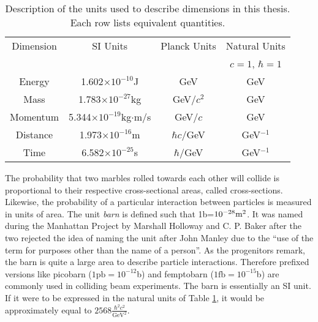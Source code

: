 \begin{table}[htp]
\begin{center}
\begin{tabular}{c c c c}
\toprule
Dimension & SI Units &  Planck Units & Natural Units \\
          &          &               & $c=1$, $\hbar = 1$ \\
\midrule
Energy    &    1.602$\times10^{-10}$J               & GeV            & GeV \\
Mass      &    1.783$\times10^{-27}$kg              & GeV/$c^2$      & GeV \\
Momentum  &    5.344$\times10^{-19}$kg$\cdot$m/s    & GeV/$c$        & GeV \\
Distance  &    1.973$\times10^{-16}$m               & $\hbar c/$GeV  & GeV$^{-1}$ \\
Time      &    6.582$\times10^{-25}$s               & $\hbar/$GeV    & GeV$^{-1}$ \\
\bottomrule
\end{tabular}
\caption{Description of the units used to describe dimensions in this thesis. Each row lists equivalent quantities.}
\label{tab:units}
\end{center}
\end{table}

The probability that two marbles rolled towards each other will collide is proportional to their respective cross-sectional areas, called cross-sections.
Likewise, the probability of a particular interaction between particles is measured in units of area.
The unit \emph{barn} is defined such that 1b=$10^{-28}\text m^2$.
It was named during the Manhattan Project by Marshall Holloway and C. P. Baker after the two rejected the idea of naming the unit after John Manley due to the ``use of the term for purposes other than the name of a person''.\cite{holloway}
As the progenitors remark, the barn is quite a large area to describe particle interactions.
Therefore prefixed versions like picobarn ($1\text{pb}=10^{-12}$b) and femptobarn ($1\text{fb}=10^{-15}$b) are commonly used in colliding beam experiments.
The barn is essentially an SI unit. If it were to be expressed in the natural units of Table \ref{tab:units}, it would be approximately equal to $2568\frac{\hbar^2 c^2}{\text{GeV}^2}$.


